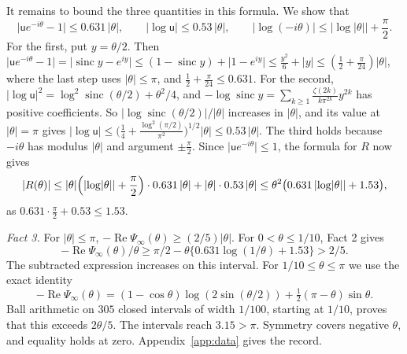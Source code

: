 It remains to bound the three quantities in this formula. We show that
\[
 \lvert\mathsf ue^{-i\theta}-1\rvert\le0.631\,\lvert\theta\rvert,\qquad
 \lvert\log\mathsf u\rvert\le0.53\,\lvert\theta\rvert,\qquad
 \lvert\log(-i\theta)\rvert\le\lvert\log\lvert\theta\rvert\rvert+\frac\pi2 .
\]
For the first, put $y=\theta/2$. Then
$\lvert\mathsf ue^{-i\theta}-1\rvert=\lvert\operatorname{sinc}y-e^{iy}\rvert
\le(1-\operatorname{sinc}y)+\lvert1-e^{iy}\rvert\le\frac{y^2}6+\lvert y\rvert
\le(\frac12+\frac\pi{24})\lvert\theta\rvert$, where the last step uses
$\lvert\theta\rvert\le\pi$, and $\frac12+\frac\pi{24}\le0.631$. For the
second,
$\lvert\log\mathsf u\rvert^2=\log^2\operatorname{sinc}(\theta/2)+\theta^2/4$,
and $-\log\operatorname{sinc}y=\sum_{k\ge1}\frac{\zeta(2k)}{k\pi^{2k}}y^{2k}$
has positive coefficients. So
$\lvert\log\operatorname{sinc}(\theta/2)\rvert/\lvert\theta\rvert$ increases in
$\lvert\theta\rvert$, and its value at $\lvert\theta\rvert=\pi$ gives
$\lvert\log\mathsf u\rvert\le\bigl(\frac14+\frac{\log^2(\pi/2)}{\pi^2}\bigr)^{1/2}\lvert\theta\rvert
\le0.53\,\lvert\theta\rvert$. The third holds because $-i\theta$ has
modulus $\lvert\theta\rvert$ and argument $\pm\frac\pi2$. Since
$\lvert\mathsf ue^{-i\theta}\rvert\le1$, the formula for $R$ now gives
\[
 \lvert R(\theta)\rvert\le\lvert\theta\rvert\Bigl(\lvert\log\lvert\theta\rvert\rvert+\frac\pi2\Bigr)\cdot0.631\,\lvert\theta\rvert
 +\lvert\theta\rvert\cdot0.53\,\lvert\theta\rvert
 \le\theta^2\bigl(0.631\,\lvert\log\lvert\theta\rvert\rvert+1.53\bigr),
\]
as $0.631\cdot\frac\pi2+0.53\le1.53$.

\emph{Fact 3.} For $|\theta|\le\pi$,
$-\operatorname{Re}\Psi_\infty(\theta)\ge(2/5)|\theta|$.
For $0<\theta\le1/10$, Fact 2 gives
\[
 -\operatorname{Re}\Psi_\infty(\theta)/\theta
 \ge\pi/2-\theta\{0.631\log(1/\theta)+1.53\}>2/5.
\]
The subtracted expression increases on this interval. For
$1/10\le\theta\le\pi$ we use the exact identity
\[
 -\operatorname{Re}\Psi_\infty(\theta)
 =(1-\cos\theta)\log(2\sin(\theta/2))
   +\tfrac12(\pi-\theta)\sin\theta.
\]
Ball arithmetic on $305$ closed intervals of width $1/100$, starting
at $1/10$, proves that this exceeds $2\theta/5$. The intervals reach
$3.15>\pi$. Symmetry covers negative $\theta$, and equality holds at
zero. Appendix~\ref{app:data} gives the record.

